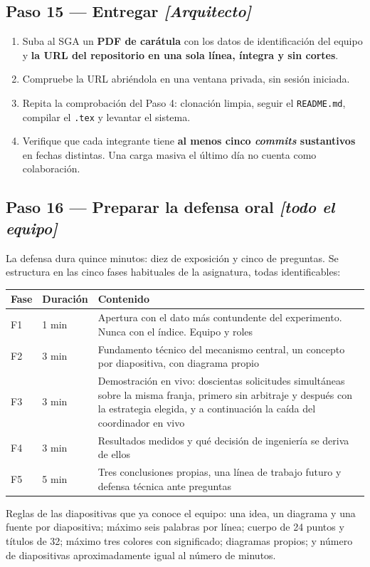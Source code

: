 \documentclass[11pt,a4paper]{article}
\newcommand{\paso}[1]{\subsection{#1}}
\begin{document}
	\paso{Paso 15 --- Entregar \emph{[Arquitecto]}}
	
	\begin{enumerate}[leftmargin=*,itemsep=4pt]
		\item Suba al SGA un \textbf{PDF de carátula} con los datos de identificación del equipo y \textbf{la URL del repositorio en una sola línea, íntegra y sin cortes}.
		\item Compruebe la URL abriéndola en una ventana privada, sin sesión iniciada.
		\item Repita la comprobación del Paso 4: clonación limpia, seguir el \texttt{README.md}, compilar el \texttt{.tex} y levantar el sistema.
		\item Verifique que cada integrante tiene \textbf{al menos cinco \emph{commits} sustantivos} en fechas distintas. Una carga masiva el último día no cuenta como colaboración.
	\end{enumerate}
	
	\paso{Paso 16 --- Preparar la defensa oral \emph{[todo el equipo]}}
	
	La defensa dura quince minutos: diez de exposición y cinco de preguntas. Se estructura en las cinco fases habituales de la asignatura, todas identificables:
	
	\begin{center}
		\small
		\begin{tabular}{@{}p{1.1cm}p{3.5cm}p{10.3cm}@{}}
			\toprule
			\textbf{Fase} & \textbf{Duración} & \textbf{Contenido} \\
			\midrule
			F1 & 1 min & Apertura con el dato más contundente del experimento. Nunca con el índice. Equipo y roles \\
			F2 & 3 min & Fundamento técnico del mecanismo central, un concepto por diapositiva, con diagrama propio \\
			F3 & 3 min & Demostración en vivo: doscientas solicitudes simultáneas sobre la misma franja, primero sin arbitraje y después con la estrategia elegida, y a continuación la caída del coordinador en vivo \\
			F4 & 3 min & Resultados medidos y qué decisión de ingeniería se deriva de ellos \\
			F5 & 5 min & Tres conclusiones propias, una línea de trabajo futuro y defensa técnica ante preguntas \\
			\bottomrule
		\end{tabular}
	\end{center}
	
	Reglas de las diapositivas que ya conoce el equipo: una idea, un diagrama y una fuente por diapositiva; máximo seis palabras por línea; cuerpo de 24 puntos y títulos de 32; máximo tres colores con significado; diagramas propios; y número de diapositivas aproximadamente igual al número de minutos.
	
\end{document}
